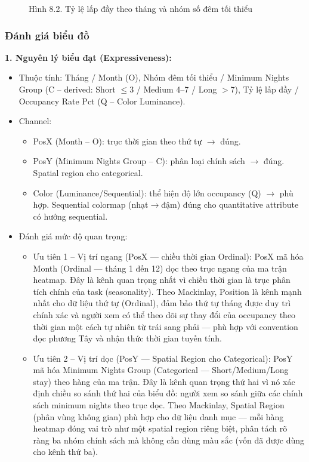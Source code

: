 \begin{figure}[H]
    \centering
    \caption{Hình 8.2. Tỷ lệ lấp đầy theo tháng và nhóm số đêm tối thiểu}
    \label{fig:domain-task8-chart2}
\end{figure}

\subsubsection{Đánh giá biểu đồ}

\textbf{1. Nguyên lý biểu đạt (Expressiveness):}

\begin{itemize}
    \item Thuộc tính: Tháng / Month (O), Nhóm đêm tối thiểu / Minimum Nights Group (C -- derived: Short $\leq$3 / Medium 4--7 / Long $>$7), Tỷ lệ lấp đầy / Occupancy Rate Pct (Q -- Color Luminance).
    \item Channel:
    \begin{itemize}
        \item PosX (Month -- O): trục thời gian theo thứ tự $\rightarrow$ đúng.
        \item PosY (Minimum Nights Group -- C): phân loại chính sách $\rightarrow$ đúng. Spatial region cho categorical.
        \item Color (Luminance/Sequential): thể hiện độ lớn occupancy (Q) $\rightarrow$ phù hợp. Sequential colormap (nhạt$\rightarrow$đậm) đúng cho quantitative attribute có hướng sequential.
    \end{itemize}
    \item Đánh giá mức độ quan trọng:
    \begin{itemize}
        \item Ưu tiên 1 -- Vị trí ngang (PosX --- chiều thời gian Ordinal): PosX mã hóa Month (Ordinal --- tháng 1 đến 12) dọc theo trục ngang của ma trận heatmap. Đây là kênh quan trọng nhất vì chiều thời gian là trục phân tích chính của task (seasonality). Theo Mackinlay, Position là kênh mạnh nhất cho dữ liệu thứ tự (Ordinal), đảm bảo thứ tự tháng được duy trì chính xác và người xem có thể theo dõi sự thay đổi của occupancy theo thời gian một cách tự nhiên từ trái sang phải --- phù hợp với convention đọc phương Tây và nhận thức thời gian tuyến tính.
        \item Ưu tiên 2 -- Vị trí dọc (PosY --- Spatial Region cho Categorical): PosY mã hóa Minimum Nights Group (Categorical --- Short/Medium/Long stay) theo hàng của ma trận. Đây là kênh quan trọng thứ hai vì nó xác định chiều so sánh thứ hai của biểu đồ: người xem so sánh giữa các chính sách minimum nights theo trục dọc. Theo Mackinlay, Spatial Region (phân vùng không gian) phù hợp cho dữ liệu danh mục --- mỗi hàng heatmap đóng vai trò như một spatial region riêng biệt, phân tách rõ ràng ba nhóm chính sách mà không cần dùng màu sắc (vốn đã được dùng cho kênh thứ ba).

\end{itemize}
\end{itemize}
